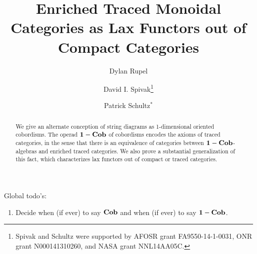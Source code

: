 \documentclass[12pt,oneside,article,draft]{memoir}
\title{Enriched Traced Monoidal Categories as Lax Functors out of Compact Categories}
\author{
Dylan Rupel 
 \and 
David I. Spivak\thanks{Spivak and Schultz were supported by AFOSR grant FA9550-14-1-0031, ONR grant N000141310260, and NASA grant NNL14AA05C.}
 \and 
 Patrick Schultz${}^*$%
 }
\begin{document}
\tightlists
\firmlists

\maketitle
\begin{abstract}
We give an alternate conception of string diagrams as 1-dimensional oriented cobordisms. The operad $\mathbf{1-Cob}$ of cobordisms encodes the axioms of traced categories, in the sense that there is an equivalence of categories between $\mathbf{1-Cob}$-algebras and enriched traced categories. We also prove a substantial generalization of this fact, which characterizes lax functors out of compact or traced categories.
\end{abstract}
Global todo's:
\begin{enumerate}
\item Decide when (if ever) to say $\mathbf{Cob}$ and when (if ever) to say $\mathbf{1-Cob}$. 
\end{enumerate}
\tableofcontents
{}


\end{document}
